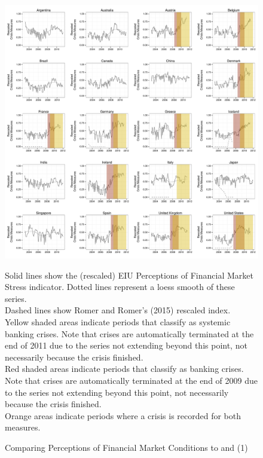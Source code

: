 \documentclass[]{article}
\begin{document}
\begin{figure}
    \caption{Comparing Perceptions of Financial Market Conditions to \cite{laeven2013} and \cite{Reinhart2009} (1)}
    \label{compare_1}
    \begin{center}
        \includegraphics[scale=0.4]{analysis/figures/compare_to_lv_rr.pdf}
    \end{center}

    {\tiny{Solid lines show the (rescaled) EIU Perceptions of Financial Market Stress indicator. Dotted lines represent a loess smooth of these series. \\

    Dashed lines show Romer and Romer's (2015) rescaled index. \\

    Yellow shaded areas indicate periods that \cite{laeven2013} classify as systemic banking crises. Note that crises are automatically terminated at the end of 2011 due to the series not extending beyond this point, not necessarily because the crisis finished. \\

    Red shaded areas indicate periods that \cite{Reinhart2009} classify as banking crises. Note that crises are automatically terminated at the end of 2009 due to the series not extending beyond this point, not necessarily because the crisis finished. \\

    Orange areas indicate periods where a crisis is recorded for both measures.}}
\end{figure}
\end{document}
